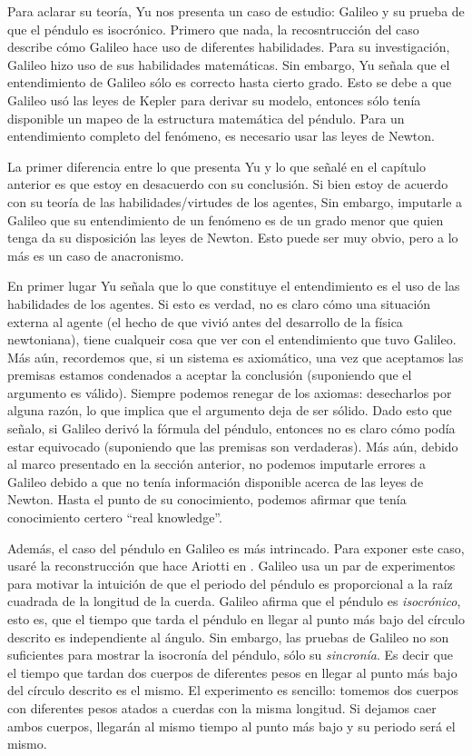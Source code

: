 Para aclarar su teoría, Yu nos presenta un caso de estudio: Galileo y su prueba de que el péndulo es isocrónico. Primero que nada, la recosntrucción del caso describe cómo Galileo hace uso de diferentes habilidades. Para su investigación, Galileo hizo uso de sus habilidades matemáticas. Sin embargo, Yu señala que el entendimiento de Galileo sólo es correcto hasta cierto grado. Esto se debe a que Galileo usó las leyes de Kepler para derivar su modelo, entonces sólo tenía disponible un mapeo de la estructura matemática del péndulo. Para un entendimiento completo del fenómeno, es necesario usar las leyes de Newton.

La primer diferencia entre lo que presenta Yu y lo que señalé en el capítulo anterior es que estoy en desacuerdo con su conclusión. Si bien estoy de acuerdo con su teoría de las habilidades/virtudes de los agentes, Sin embargo, imputarle a Galileo que su entendimiento de un fenómeno es de un grado menor que quien tenga da su disposición las leyes de Newton. Esto puede ser muy obvio, pero a lo más es un caso de anacronismo.

En primer lugar Yu señala que lo que constituye el entendimiento es el uso de las habilidades de los agentes. Si esto es verdad, no es claro cómo una situación externa al agente (el hecho de que vivió antes del desarrollo de la física newtoniana), tiene cualqueir cosa que ver con el entendimiento que tuvo Galileo. Más aún, recordemos que, si un sistema es axiomático, una vez que aceptamos las premisas estamos condenados a aceptar la conclusión (suponiendo que el argumento es válido). Siempre podemos renegar de los axiomas: desecharlos por alguna razón, lo que implica que el argumento deja de ser sólido. Dado esto que señalo, si Galileo derivó la fórmula del péndulo, entonces no es claro cómo podía estar equivocado (suponiendo que las premisas son verdaderas). Más aún, debido al marco presentado en la sección anterior, no podemos imputarle errores a Galileo debido a que no tenía información disponible acerca de las leyes de Newton. Hasta el punto de su conocimiento, podemos afirmar que tenía conocimiento certero ``real knowledge''.

Además, el caso del péndulo en Galileo es más intrincado. Para exponer este caso, usaré la reconstrucción que hace Ariotti en \citeyear{Ariotti1968}. Galileo usa un par de experimentos para motivar la intuición de que el periodo del péndulo es proporcional a la raíz cuadrada de la longitud de la cuerda. Galileo afirma que el péndulo es \emph{isocrónico}, esto es, que el tiempo que tarda el péndulo en llegar al punto más bajo del círculo descrito es independiente al ángulo. Sin embargo, las pruebas de Galileo no son suficientes para mostrar la isocronía del péndulo, sólo su \emph{sincronía}. Es decir que el tiempo que tardan dos cuerpos de diferentes pesos en llegar al punto más bajo del círculo descrito es el mismo. El experimento es sencillo: tomemos dos cuerpos con diferentes pesos atados a cuerdas con la misma longitud. Si dejamos caer ambos cuerpos, llegarán al mismo tiempo al punto más bajo y su periodo será el mismo.

